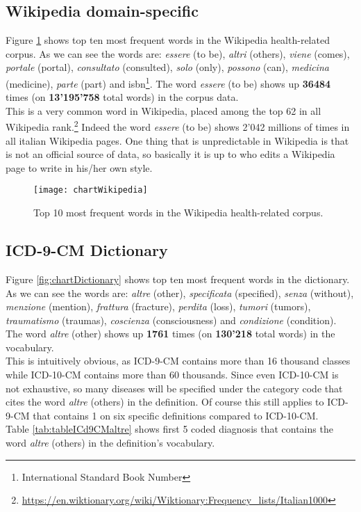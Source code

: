 \subsection{Wikipedia domain-specific}
Figure \ref{fig:chartWikipedia} shows top ten most frequent words in the Wikipedia health-related corpus. As we can see the words are: \textit{essere} (to be), \textit{altri} (others), \textit{viene} (comes), \textit{portale} (portal), \textit{consultato} (consulted), \textit{solo} (only), \textit{possono} (can), \textit{medicina} (medicine), \textit{parte} (part) and isbn\footnote{International Standard Book Number}.
The word \textit{essere} (to be) shows up \textbf{36484} times (on \textbf{13'195'758} total words) in the corpus data.\\
This is a very common word in Wikipedia, placed among the top 62 in all Wikipedia rank.\footnote{\url{https://en.wiktionary.org/wiki/Wiktionary:Frequency_lists/Italian1000}} Indeed the word \textit{essere} (to be) shows 2'042 millions of times in all italian Wikipedia pages. One thing that is unpredictable in Wikipedia is that is not an official source of data, so basically it is up to who edits a Wikipedia page to write in his/her own style.\\
\begin{figure}[ht]
	\centering
	\texttt{[image: chartWikipedia]}
	\caption[Top 10 most frequent words in Wikipedia health-specific corpus]{Top 10 most frequent words in the Wikipedia health-related corpus.}
	\label{fig:chartWikipedia}
\end{figure}

\subsection{ICD-9-CM Dictionary}
Figure \ref{fig:chartDictionary} shows top ten most frequent words in the dictionary. As we can see the words are: \textit{altre} (other), \textit{specificata} (specified), \textit{senza} (without), \textit{menzione} (mention), \textit{frattura} (fracture),  \textit{perdita} (loss), \textit{tumori} (tumors), \textit{traumatismo} (traumas), \textit{coscienza} (consciousness) and \textit{condizione} (condition).
The word \textit{altre} (other) shows up \textbf{1761} times (on \textbf{130'218} total words) in the vocabulary.\\
This is intuitively obvious, as ICD-9-CM contains more than 16 thousand classes while ICD-10-CM contains more than 60 thousands. Since even ICD-10-CM is not exhaustive, so many diseases will be specified under the category code that cites the word \textit{altre} (others) in the definition. Of course this still applies to ICD-9-CM that contains 1 on six specific definitions compared to ICD-10-CM.\\
Table \ref{tab:tableICd9CMaltre} shows first 5 coded diagnosis that contains the word \textit{altre} (others) in the definition's vocabulary.

